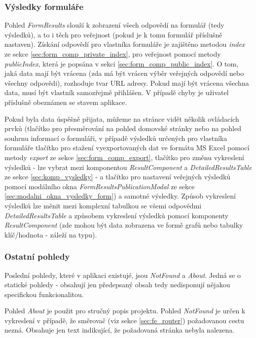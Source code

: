 		\subsubsection{Výsledky formuláře}\label{sec:pohled_vysledky_formulare} %
		Pohled \textit{FormResults} slouží k zobrazení všech odpovědí na formulář (tedy výsledků), a to i těch pro veřejnost (pokud je k tomu formulář příslušně nastaven). Získání odpovědí pro vlastníka formuláře je zajištěno metodou \textit{index} ze sekce \ref{sec:form_comp_private_index}, pro veřejnost pomocí metody \textit{publicIndex}, která je popsána v sekci \ref{sec:form_comp_public_index}. O tom, jaká data mají být vrácena (zda má být vrácen výběr veřejných odpovědí nebo všechny odpovědi), rozhoduje tvar URL adresy. Pokud mají být vrácena všechna data, musí být vlastník samozřejmě přihlášen. V případě chyby je uživatel příslušně obeznámen se stavem aplikace.
		
		Pokud byla data úspěšně přijata, můžeme na stránce vidět několik ovládacích prvků (tlačítko pro přesměrování na pohled domovské stránky nebo na pohled souhrnu informací o formuláři, v případě výsledků určených pro vlastníka formuláře tlačítko pro stažení vyexportovaných dat ve formátu MS Excel pomocí metody \textit{export} ze sekce \ref{sec:form_comp_export}, tlačítko pro změnu vykreslení výsledků - lze vybrat mezi komponentou \textit{ResultComponent} a \textit{DetailedResultsTable} ze sekce \ref{sec:komp_vysledky} - a tlačítko pro nastavení veřejných výsledků pomocí modálního okna \textit{FormResultsPublicationModal} ze sekce \ref{sec:modalni_okna_vysledky_form}) a samotné výsledky. Způsob vykreslení výsledků lze měnit mezi komplexní tabulkou se všemi odpovědmi \textit{DetailedResultsTable} a způsobem vykreslení výsledků  pomocí komponenty \textit{ResultComponent} (zde mohou být data zobrazena ve formě grafů nebo tabulky klíč/hodnota - záleží na typu).
		
		\subsubsection{Ostatní pohledy} %
		Poslední pohledy, které v aplikaci existujé, jsou \textit{NotFound} a \textit{About}. Jedná se o statické pohledy - obsahují jen předepsaný obsah tedy nedisponují nějakou specifickou funkcionalitou. 
		
		Pohled \textit{About} je použit pro stručný popis projektu. Pohled \textit{NotFound} je určen k vykreslení v případě, že směrovač (viz sekce \ref{sec:fe_router}) požadovanou cestu nezná. Obsahuje jen text indikující, že požadovaná stránka nebyla nalezena.
